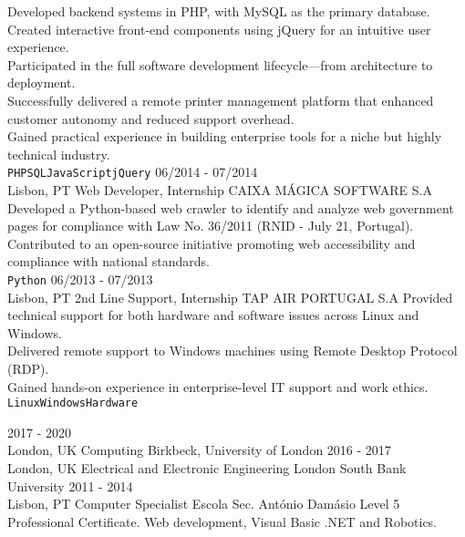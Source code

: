 \documentclass[9pt]{lib/developercv} %
\begin{document}
\begin{entrylist}
{			Developed backend systems in PHP, with MySQL as the primary database.\\
			Created interactive front-end components using jQuery for an intuitive user experience.\\
			Participated in the full software development lifecycle—from architecture to deployment.\\
			Successfully delivered a remote printer management platform that enhanced customer autonomy and reduced support overhead.\\
			Gained practical experience in building enterprise tools for a niche but highly technical industry.\\
			\texttt{PHP}\slashsep\texttt{SQL}\slashsep\texttt{JavaScript}\slashsep\texttt{jQuery}
		}
	\entry
		{06/2014 - 07/2014\\\footnotesize{Lisbon, PT}}
		{Web Developer, Internship}
		{CAIXA MÁGICA SOFTWARE S.A}
		{
			Developed a Python-based web crawler to identify and analyze web government pages for compliance with Law No. 36/2011 (RNID - July 21, Portugal).\\
			Contributed to an open-source initiative promoting web accessibility and compliance with national standards.\\
			\texttt{Python}
		}
	\entry
		{06/2013 - 07/2013\\\footnotesize{Lisbon, PT}}
		{2nd Line Support, Internship}
		{TAP AIR PORTUGAL S.A}
		{
			Provided technical support for both hardware and software issues across Linux and Windows.\\
			Delivered remote support to Windows machines using Remote Desktop Protocol (RDP).\\
			Gained hands-on experience in enterprise-level IT support and work ethics.\\
			\texttt{Linux}\slashsep\texttt{Windows}\slashsep\texttt{Hardware}
		}
\end{entrylist}



\begin{entrylist}
	\entry
		{2017 - 2020\\\footnotesize{London, UK}}
		{Computing}
		{Birkbeck, University of London}
		{}
	\entry
		{2016 - 2017\\\footnotesize{London, UK}}
		{Electrical and Electronic Engineering}
		{London South Bank University}
		{}
	\entry
		{2011 - 2014\\\footnotesize{Lisbon, PT}}
		{Computer Specialist}
		{Escola Sec. António Damásio}
		{Level 5 Professional Certificate. Web development, Visual Basic .NET and Robotics.}
\end{entrylist}
\end{document}
